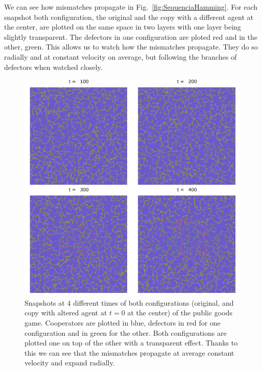 We can see how mismatches propagate in Fig.~\ref{fig:SequenciaHamming}. For each snapshot both configuration, the original and the copy with a different agent at the center, are plotted on the same space in two layers with one layer being slightly transparent. The defectors in one configuration are ploted red and in the other, green. This allows us to watch how the mismatches propagate. They do so radially and at constant velocity on average, but following the branches of defectors when watched closely.


\begin{figure}
    \centering
    \includegraphics[width=0.8\linewidth]{Images/P3/PGG_SecuenciaHamming.png}
    \caption{Snapshots at $4$ different times of both configurations (original, and copy with altered agent at $t = 0$ at the center) of the public goods game. Cooperators are plotted in blue, defectors in red for one configuration and in green for the other. Both configurations are plotted one on top of the other with a transparent effect. Thanks to this we can see that the mismatches propagate at average constant velocity and expand radially.}
    \label{fig:PGG_SequenciaHamming}
\end{figure}





